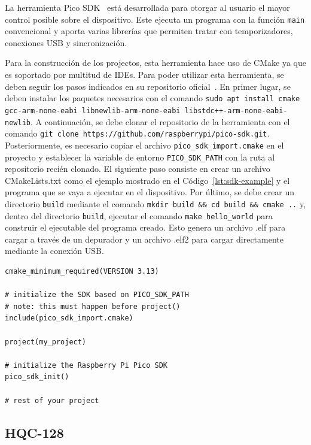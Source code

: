 La herramienta Pico SDK~\cite{pico-sdk} está desarrollada para otorgar al usuario el mayor control posible sobre el dispositivo.
Este ejecuta un programa con la función \texttt{main} convencional y aporta varias librerías que permiten tratar con temporizadores, conexiones USB y sincronización.

Para la construcción de los projectos, esta herramienta hace uso de CMake ya que es soportado por multitud de IDEs.
Para poder utilizar esta herramienta, se deben seguir los pasos indicados en su repositorio oficial~\cite{pico-sdk-github}.
En primer lugar, se deben instalar los paquetes necesarios con el comando \texttt{sudo apt install cmake gcc-arm-none-eabi libnewlib-arm-none-eabi libstdc++-arm-none-eabi-newlib}.
A continuación, se debe clonar el repositorio de la herramienta con el comando \texttt{git clone https://github.com/raspberrypi/pico-sdk.git}.
Posteriormente, es necesario copiar el archivo \texttt{pico\_sdk\_import.cmake} en el proyecto y establecer la variable de entorno \texttt{PICO\_SDK\_PATH} con la ruta al repositorio recién clonado.
El siguiente paso consiste en crear un archivo CMakeLists.txt como el ejemplo mostrado en el Código~\ref{lst:sdk-example} y el programa que se vaya a ejecutar en el dispositivo.
Por último, se debe crear un directorio \texttt{build} mediante el comando \texttt{mkdir build \&\& cd build \&\& cmake ..} y, dentro del directorio \texttt{build}, ejecutar el comando \texttt{make hello\_world} para construir el ejecutable del programa creado.
Esto genera un archivo .elf para cargar a través de un depurador y un archivo .elf2 para cargar directamente mediante la conexión \ac{USB}.

\begin{lstlisting}[label={lst:sdk-example},style=Cnice,firstnumber=1,caption={Ejemplo de CMakeLists.txt~\cite{pico-sdk-github}.}]
cmake_minimum_required(VERSION 3.13)

# initialize the SDK based on PICO_SDK_PATH
# note: this must happen before project()
include(pico_sdk_import.cmake)

project(my_project)

# initialize the Raspberry Pi Pico SDK
pico_sdk_init()

# rest of your project
\end{lstlisting}


\subsection{HQC-128}\label{subsec:hqc}

